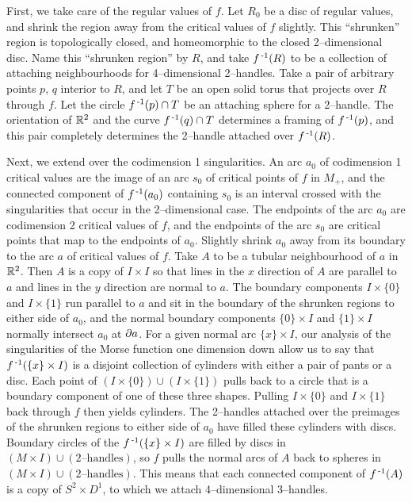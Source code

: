 First, we take care of the regular values of $f$.
Let $R_0$ be a disc of regular values, and shrink the region away from the critical values of $f$ slightly.
This ``shrunken'' region is topologically closed, and homeomorphic to the closed 2--dimensional disc.
Name this ``shrunken region'' by $R$, and take $f^{\,\text{-}1} (R)$ to be a collection of attaching neighbourhoods for 4--dimensional 2--handles.
Take a pair of arbitrary points $p$, $q$ interior to $R$, and let $T$ be an open solid torus that projects over $R$ through $f$.
Let the circle $f^{\,\text{-}1} (p)\cap T$ be an attaching sphere for a 2--handle.
The orientation of $\mathbb{R}^2$ and the curve $f^{\,\text{-}1} (q)\cap T$ determines a framing of $f^{\,\text{-}1} (p)$, and this pair completely determines the 2--handle attached over $f^{\,\text{-}1} (R)$.

Next, we extend over the codimension 1 singularities.
An arc $a_0$ of codimension 1 critical values are the image of an arc $s_0$ of critical points of $f$ in $M_+$, and the connected component of $f^{\,\text{-}1} (a_0)$ containing $s_0$ is an interval crossed with the singularities that occur in the 2--dimensional case.
The endpoints of the arc $a_0$ are codimension 2 critical values of $f$, and the endpoints of the arc $s_0$ are critical points that map to the endpoints of $a_0$.
Slightly shrink $a_0$ away from its boundary to the arc $a$ of critical values of $f$.
Take $A$ to be a tubular neighbourhood of $a$ in $\mathbb{R}^2$.
Then $A$ is a copy of $I\times I$ so that lines in the $x$ direction of $A$ are parallel to $a$ and lines in the $y$ direction are normal to $a$.
The boundary components $I\times \{0\}$ and $I\times \{1\}$ run parallel to $a$ and sit in the boundary of the shrunken regions to either side of $a_0$, and the normal boundary components $\{0\}\times I$ and $\{1\}\times I$ normally intersect $a_0$ at $\partial a$.
For a given normal arc $\{x\}\times I$, our analysis of the singularities of the Morse function one dimension down allow us to say that $f^{\,\text{-}1}(\{x\}\times I)$ is a disjoint collection of cylinders with either a pair of pants or a disc.
Each point of $(I\times \{0\})\cup (I\times\{1\})$ pulls back to a circle that is a boundary component of one of these three shapes.
Pulling $I\times \{0\}$ and $I\times\{1\}$ back through $f$ then yields cylinders.
The 2--handles attached over the preimages of the shrunken regions to either side of $a_0$ have filled these cylinders with discs.
Boundary circles of the $f^{\,\text{-}1} (\{x\}\times I)$ are filled by discs in $(M\times I)\cup (2\text{--handles})$, so $f$ pulls the normal arcs of $A$ back to spheres in $(M\times I)\cup (2\text{--handles})$.
This means that each connected component of $f^{\,\text{-}1} (A)$ is a copy of $S^2\times D^1$, to which we attach 4--dimensional 3--handles.

